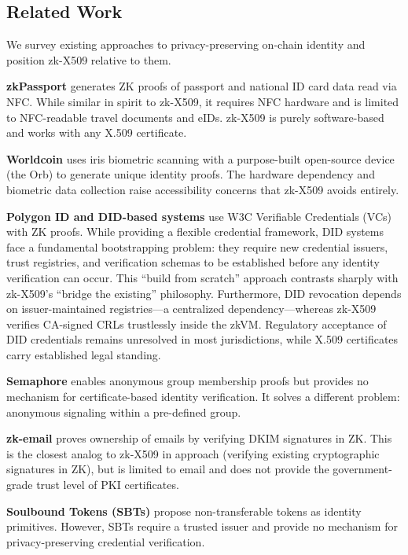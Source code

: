 \documentclass[11pt, a4paper]{article}
\begin{document}
\subsection{Related Work}\label{related-work}

We survey existing approaches to privacy-preserving on-chain identity
and position zk-X509 relative to them.

\textbf{zkPassport} \cite{ref2} generates ZK proofs of passport and
national ID card data read via NFC. While similar in spirit to zk-X509,
it requires NFC hardware and is limited to NFC-readable travel documents
and eIDs. zk-X509 is purely software-based and works with any X.509
certificate.

\textbf{Worldcoin} \cite{ref3} uses iris biometric scanning with a
purpose-built open-source device (the Orb) to generate unique identity
proofs. The hardware dependency and biometric data collection raise
accessibility concerns that zk-X509 avoids entirely.

\textbf{Polygon ID and DID-based systems} \cite{ref13, ref33} use W3C Verifiable
Credentials (VCs) with ZK proofs. While providing a flexible credential
framework, DID systems face a fundamental bootstrapping problem: they
require new credential issuers, trust registries, and verification
schemas to be established before any identity verification can occur.
This ``build from scratch'' approach contrasts sharply with zk-X509's
``bridge the existing'' philosophy. Furthermore, DID revocation depends
on issuer-maintained registries---a centralized dependency---whereas
zk-X509 verifies CA-signed CRLs trustlessly inside the zkVM. Regulatory
acceptance of DID credentials remains unresolved in most jurisdictions,
while X.509 certificates carry established legal standing.

\textbf{Semaphore} \cite{ref8} enables anonymous group membership proofs but
provides no mechanism for certificate-based identity verification. It
solves a different problem: anonymous signaling within a pre-defined
group.

\textbf{zk-email} \cite{ref9} proves ownership of emails by verifying DKIM
signatures in ZK. This is the closest analog to zk-X509 in approach
(verifying existing cryptographic signatures in ZK), but is limited to
email and does not provide the government-grade trust level of PKI
certificates.

\textbf{Soulbound Tokens (SBTs)} \cite{ref10} propose non-transferable
tokens as identity primitives. However, SBTs require a trusted issuer
and provide no mechanism for privacy-preserving credential verification.
\end{document}
